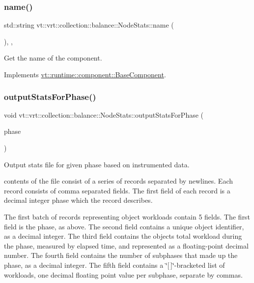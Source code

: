 \subsubsection{\texorpdfstring{name()}{name()}}
{\footnotesize\ttfamily std\+::string vt\+::vrt\+::collection\+::balance\+::\+Node\+Stats\+::name (\begin{DoxyParamCaption}{ }\end{DoxyParamCaption})\hspace{0.3cm}{\ttfamily [inline]}, {\ttfamily [override]}, {\ttfamily [virtual]}}



Get the name of the component. 



Implements \hyperlink{structvt_1_1runtime_1_1component_1_1_base_component_a7701485f3539f78d42e6bad47fc7eb78}{vt\+::runtime\+::component\+::\+Base\+Component}.

\mbox{\label{structvt_1_1vrt_1_1collection_1_1balance_1_1_node_stats_aa6e33fd5ae9275515557ada40ef3d489}} 
\subsubsection{\texorpdfstring{output\+Stats\+For\+Phase()}{outputStatsForPhase()}}
{\footnotesize\ttfamily void vt\+::vrt\+::collection\+::balance\+::\+Node\+Stats\+::output\+Stats\+For\+Phase (\begin{DoxyParamCaption}\item[{\hyperlink{namespacevt_a46ce6733d5cdbd735d561b7b4029f6d7}{Phase\+Type}}]{phase }\end{DoxyParamCaption})}



Output stats file for given phase based on instrumented data. 

contents of the file consist of a series of records separated by newlines. Each record consists of comma separated fields. The first field of each record is a decimal integer phase which the record describes.

The first batch of records representing object workloads contain 5 fields. The first field is the phase, as above. The second field contains a unique object identifier, as a decimal integer. The third field contains the object\textquotesingle{}s total workload during the phase, measured by elapsed time, and represented as a floating-\/point decimal number. The fourth field contains the number of subphases that made up the phase, as a decimal integer. The fifth field contains a \char`\"{}\mbox{[}$\,$\mbox{]}\char`\"{}-\/bracketed list of workloads, one decimal floating point value per subphase, separate by commas.

